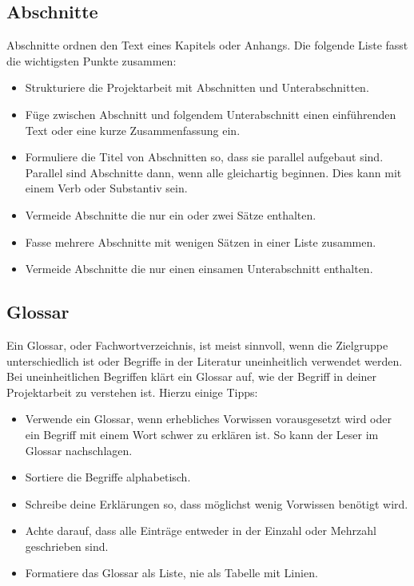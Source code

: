 \documentclass[a4paper,titlepage=true,twoside]{scrartcl}
\newcommand{\gquote}[1]{\glqq #1\grqq}
\begin{document}
\subsection{Abschnitte}
Abschnitte ordnen den Text eines Kapitels oder Anhangs. Die folgende Liste fasst
die wichtigsten Punkte zusammen:

\begin{itemize}
 \item Strukturiere die Projektarbeit mit Abschnitten und Unterabschnitten. 
 \item Füge zwischen Abschnitt und folgendem Unterabschnitt einen einführenden
 Text oder eine kurze Zusammenfassung ein.
 \item Formuliere die Titel von Abschnitten so, dass sie \gquote{parallel} aufgebaut sind.
 Parallel sind Abschnitte dann, wenn alle gleichartig beginnen. Dies kann mit 
  einem Verb oder Substantiv sein.
 \item Vermeide Abschnitte die nur ein oder zwei Sätze enthalten. 
 \item Fasse mehrere Abschnitte mit wenigen Sätzen in einer Liste zusammen.
 \item Vermeide Abschnitte die nur einen einsamen Unterabschnitt enthalten.
\end{itemize}

\subsection{Glossar}
Ein Glossar, oder Fachwortverzeichnis, ist meist sinnvoll, wenn die Zielgruppe
unterschiedlich ist oder Begriffe in der Literatur uneinheitlich verwendet 
werden. Bei uneinheitlichen Begriffen klärt ein Glossar auf, wie der Begriff
in deiner Projektarbeit zu verstehen ist. Hierzu einige Tipps:

\begin{itemize}
 \item Verwende ein Glossar, wenn erhebliches Vorwissen vorausgesetzt wird
oder ein Begriff mit einem Wort schwer zu erklären ist. So kann der Leser im
 Glossar nachschlagen.
 \item Sortiere die Begriffe alphabetisch.
 \item Schreibe deine Erklärungen so, dass möglichst wenig Vorwissen benötigt wird.
 \item Achte darauf, dass alle Einträge entweder in der Einzahl oder Mehrzahl 
 geschrieben sind.
 \item Formatiere das Glossar als Liste, nie als Tabelle mit Linien.
\end{itemize}
\end{document}
